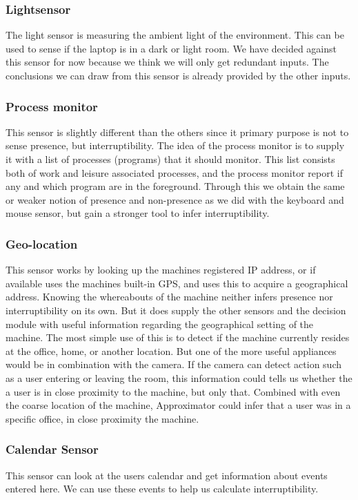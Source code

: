 \documentclass{sigchi}
\begin{document}
\subsubsection{Lightsensor}
The light sensor is measuring the ambient light of the environment.
This can be used to sense if the laptop is in a dark or light room.
We have decided against this sensor for now because we think we will only get redundant inputs.
The conclusions we can draw from this sensor is already provided by the other inputs.

\subsubsection{Process monitor}
This sensor is slightly different than the others since it primary purpose is not to sense presence, but interruptibility.
The idea of the process monitor is to supply it with a list of processes (programs) that it should monitor.
This list consists both of work and leisure associated processes, and the process monitor report if any and which program are in the foreground. %
Through this we obtain the same or weaker notion of presence and non-presence as we did with the keyboard and mouse sensor, but gain a stronger tool to infer interruptibility.

\subsubsection{Geo-location}
This sensor works by looking up the machines registered IP address, or if available uses the machines built-in GPS, and uses this to acquire a geographical address.
Knowing the whereabouts of the machine neither infers presence nor interruptibility on its own.
But it does supply the other sensors and the decision module with useful information regarding the geographical setting of the machine.
The most simple use of this is to detect if the machine currently resides at the office, home, or another location.
But one of the more useful appliances would be in combination with the camera.
If the camera can detect action such as a user entering or leaving the room, this information could tells us whether the a user is in close proximity to the machine, but only that.
Combined with even the coarse location of the machine, Approximator could infer that a user was in a specific office, in close proximity the machine.

\subsubsection{Calendar Sensor}
This sensor can look at the users calendar and get information about events entered here.
We can use these events to help us calculate interruptibility.
\end{document}
